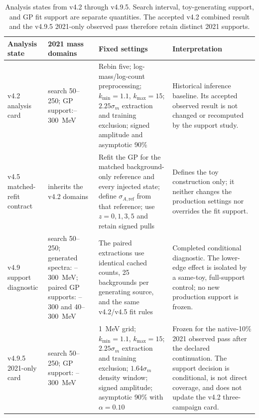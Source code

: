 \begin{table}[H]
\centering
\small
\begin{tabularx}{\textwidth}{P{0.14\textwidth}P{0.20\textwidth}Y Y}
\toprule
Analysis state & 2021 mass domains & Fixed settings & Interpretation \\
\midrule
v4.2 analysis card & search 50--250; GP support:--300~MeV &
Rebin five; log-mass/log-count preprocessing; $k_{\min}=1.1$,
$k_{\max}=15$; $2.25\sigma_m$ extraction and training exclusion; signed
amplitude and asymptotic 90\% \CLs{} &
Historical inference baseline.  Its accepted observed result is not changed or
recomputed by the support study. \\
v4.5 matched-refit contract & inherits the v4.2 domains &
Refit the GP for the matched background-only reference and every injected state;
define $\sigma_{A,\mathrm{ref}}$ from that reference; use
$z=0,1,3,5$ and retain signed pulls &
Defines the toy construction only; it neither changes the production settings nor
overrides the fit support. \\
v4.9 support diagnostic & search 50--250; generated spectra: --300~MeV; paired GP supports: --300 and 40--300~MeV &
The paired extractions use identical cached counts, 25 backgrounds per generating
source, and the same v4.2/v4.5 fit rules &
Completed conditional diagnostic. The lower-edge effect is isolated by a same-toy,
full-support control; no new production support is frozen. \\
v4.9.5 2021-only card & search 50--250; GP support: --300~MeV &
1~MeV grid; $k_{\min}=1.1$, $k_{\max}=15$; $2.25\sigma_m$ extraction and training
exclusion; $1.64\sigma_m$ density window; signed amplitude; asymptotic 90\% \CLs{}
with $\alpha=0.10$ &
Frozen for the native-10\% 2021 observed pass after the declared continuation. The
support decision is conditional, is not direct coverage, and does not update the v4.2
three-campaign card. \\
\bottomrule
\end{tabularx}
\caption{Analysis states from v4.2 through v4.9.5. Search interval, toy-generating
support, and GP fit support are separate quantities. The accepted v4.2 combined result
and the v4.9.5 2021-only observed pass therefore retain distinct 2021 supports.}
\label{tab:v4p9-card-lineage}
\end{table}

